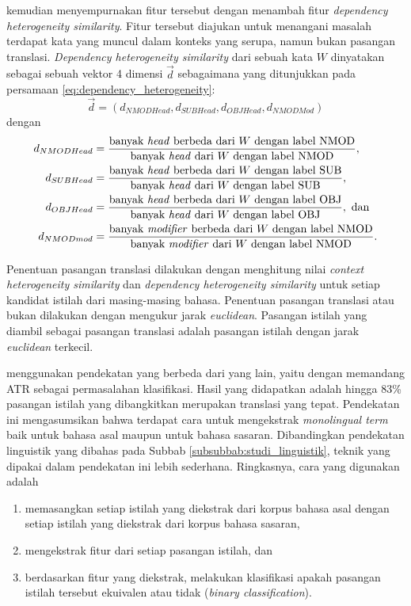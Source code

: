 \documentclass[../main/main.tex]{subfiles}
\begin{document}
\textcite{yu} kemudian menyempurnakan fitur tersebut dengan menambah fitur \textit{dependency heterogeneity similarity}. Fitur tersebut diajukan untuk menangani masalah terdapat kata yang muncul dalam konteks yang serupa, namun bukan pasangan translasi. \textit{Dependency heterogeneity similarity} dari sebuah kata $W$ dinyatakan sebagai sebuah vektor 4 dimensi $\vec{d}$ sebagaimana yang ditunjukkan pada persamaan \ref{eq:dependency_heterogeneity}:
\begin{equation} \label{eq:dependency_heterogeneity}
\vec{d} = (d_{NMODHead}, d_{SUBHead}, d_{OBJHead}, d_{NMODMod})
\end{equation}
dengan
\[
\begin{aligned}
	d_{NMODHead} &= \frac{\text{banyak \textit{head} berbeda dari $W$ dengan label NMOD}}{\text{banyak \textit{head} dari $W$ dengan label NMOD}},\\
	d_{SUBHead} &= \frac{\text{banyak \textit{head} berbeda dari $W$ dengan label SUB}}{\text{banyak \textit{head} dari $W$ dengan label SUB}},\\
	d_{OBJHead} &= \frac{\text{banyak \textit{head} berbeda dari $W$ dengan label OBJ}}{\text{banyak \textit{head} dari $W$ dengan label OBJ}}, \text{ dan}\\
	d_{NMODmod} &= \frac{\text{banyak \textit{modifier} berbeda dari $W$ dengan label NMOD}}{\text{banyak \textit{modifier} dari $W$ dengan label NMOD}}.
\end{aligned}
\]

Penentuan pasangan translasi dilakukan dengan menghitung nilai \textit{context heterogeneity similarity} dan \textit{dependency heterogeneity similarity} untuk setiap kandidat istilah dari masing-masing bahasa. Penentuan pasangan translasi atau bukan dilakukan dengan mengukur jarak \textit{euclidean}. Pasangan istilah yang diambil sebagai pasangan translasi adalah pasangan istilah dengan jarak \textit{euclidean} terkecil.

\textcite{aker} menggunakan pendekatan yang berbeda dari yang lain, yaitu dengan memandang ATR sebagai permasalahan klasifikasi. Hasil yang didapatkan adalah hingga 83\% pasangan istilah yang dibangkitkan merupakan translasi yang tepat. Pendekatan ini mengasumsikan bahwa terdapat cara untuk mengekstrak \textit{monolingual term} baik untuk bahasa asal maupun untuk bahasa sasaran. Dibandingkan pendekatan linguistik yang dibahas pada Subbab \ref{subsubbab:studi_linguistik}, teknik yang dipakai dalam pendekatan ini lebih sederhana. Ringkasnya, cara yang digunakan adalah
\begin{enumerate}
\item memasangkan setiap istilah yang diekstrak dari korpus bahasa asal dengan setiap istilah yang diekstrak dari korpus bahasa sasaran,
\item mengekstrak fitur dari setiap pasangan istilah, dan
\item berdasarkan fitur yang diekstrak, melakukan klasifikasi apakah pasangan istilah tersebut ekuivalen atau tidak (\textit{binary classification}).
\end{enumerate}
\end{document}
